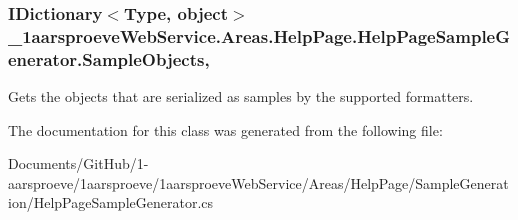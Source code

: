 \subsubsection[{Sample\+Objects}]{\setlength{\rightskip}{0pt plus 5cm}I\+Dictionary$<$Type, object$>$ \+\_\+1aarsproeve\+Web\+Service.\+Areas.\+Help\+Page.\+Help\+Page\+Sample\+Generator.\+Sample\+Objects\hspace{0.3cm}{\ttfamily [get]}, {\ttfamily [set]}}\label{class__1aarsproeve_web_service_1_1_areas_1_1_help_page_1_1_help_page_sample_generator_aa9621fc1bc0621b656579d3967528dcc}


Gets the objects that are serialized as samples by the supported formatters. 



The documentation for this class was generated from the following file\+:\begin{DoxyCompactItemize}
\item 
Documents/\+Git\+Hub/1-\/aarsproeve/1aarsproeve/1aarsproeve\+Web\+Service/\+Areas/\+Help\+Page/\+Sample\+Generation/Help\+Page\+Sample\+Generator.\+cs\end{DoxyCompactItemize}
